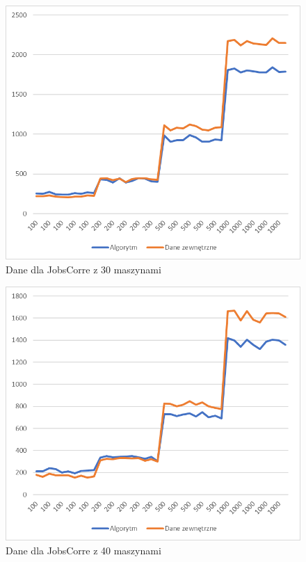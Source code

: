 \begin{figure}[h]
    \centering
    \includegraphics[scale=0.3]{jobs_30.png}
    \caption{Dane dla JobsCorre z 30 maszynami}
    \label{jobs_30}
\end{figure}

\begin{figure}[h]
    \centering
    \includegraphics[scale=0.3]{jobs_40.png}
    \caption{Dane dla JobsCorre z 40 maszynami}
    \label{jobs_40}
\end{figure}

